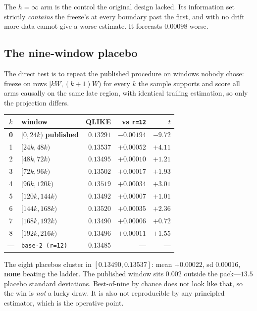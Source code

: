 \documentclass[11pt,a4paper]{article}
\begin{document}
The $h=\infty$ arm is the control the original design lacked. Its information
set strictly \emph{contains} the freeze's at every boundary past the first, and
with no drift more data cannot give a worse estimate. It forecasts $0.00098$
worse.

\subsection{The nine-window placebo}

The direct test is to repeat the published procedure on windows nobody chose:
freeze on rows $[kW,(k{+}1)W)$ for every $k$ the sample supports and score all
arms causally on the same late region, with identical trailing estimation, so
only the projection differs.

\begin{table}[h]
\centering
\begin{tabular}{clrrr}
\toprule
$k$ & window & QLIKE & vs \texttt{r=12} & $t$ \\
\midrule
\textbf{0} & $[0,24k)$ \textbf{published} & $\mathbf{0.13291}$ &
  $\mathbf{-0.00194}$ & $\mathbf{-9.72}$ \\
1 & $[24k,48k)$   & $0.13537$ & $+0.00052$ & $+4.11$ \\
2 & $[48k,72k)$   & $0.13495$ & $+0.00010$ & $+1.21$ \\
3 & $[72k,96k)$   & $0.13502$ & $+0.00017$ & $+1.93$ \\
4 & $[96k,120k)$  & $0.13519$ & $+0.00034$ & $+3.01$ \\
5 & $[120k,144k)$ & $0.13492$ & $+0.00007$ & $+1.01$ \\
6 & $[144k,168k)$ & $0.13520$ & $+0.00035$ & $+2.36$ \\
7 & $[168k,192k)$ & $0.13490$ & $+0.00006$ & $+0.72$ \\
8 & $[192k,216k)$ & $0.13496$ & $+0.00011$ & $+1.55$ \\
\midrule
--- & \texttt{base-2 (r=12)} & $0.13485$ & --- & --- \\
\bottomrule
\end{tabular}
\end{table}

\noindent
The eight placebos cluster in $[0.13490,0.13537]$: mean $+0.00022$, sd
$0.00016$, \textbf{none} beating the ladder. The published window sits
$0.002$ outside the pack---$13.5$ placebo standard deviations. Best-of-nine by
chance does not look like that, so the win is \emph{not} a lucky draw. It is
also not reproducible by any principled estimator, which is the operative
point.
\end{document}
